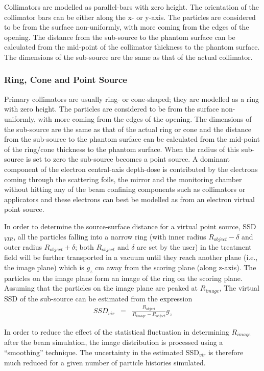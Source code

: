 \documentclass[12pt,twoside]{article}
\begin{document}
Collimators are modelled as parallel-bars with zero height. The orientation of the collimator bars can be either along the x- or y-axis. The particles are considered to be from the surface non-uniformly, with more coming from the edges of the opening. The distance from the sub-source to the phantom surface can be calculated from the mid-point of the collimator thickness to the phantom surface. The dimensions of the sub-source are the same as that of the actual collimator.

\subsubsection{Ring, Cone and Point Source}

Primary collimators are usually ring- or cone-shaped; they are modelled as a ring with zero height. The particles are considered to be from the surface non-uniformly, with more coming from the edges of the opening. The dimensions of the sub-source are the same as that of the actual ring or cone and the distance from the sub-source to the phantom surface can be calculated from the mid-point of the ring/cone thickness to the phantom surface. When the radius of this sub-source is set to zero the sub-source becomes a point source. A dominant component of the electron central-axis depth-dose is contributed by the electrons coming through the scattering foils, the mirror and the monitoring chamber without hitting any of the beam confining components such as collimators or applicators and these electrons can best be modelled as from an electron virtual point source.


In order to determine the source-surface distance
for a virtual point source, SSD$_{VIR}$,  all the particles falling into a
narrow ring (with inner radius $R_{object} - \delta$ and outer radius
$R_{object} + \delta$; both  $R_{object}$ and $\delta$ are set by the
user) in the treatment field will be further transported in a vacuum until
they reach another plane (i.e., the image plane) which is $g_z$ cm away
from the scoring plane (along z-axis). The particles on the image plane
form an image of the ring on the scoring plane. Assuming that the
particles on the image plane are peaked at $R_{image}$,  The virtual SSD
of the sub-source can be estimated from the expression
\begin{eqnarray} SSD_{vir} & =&  \frac{ R_{object}}{R_{image} -
 R_{object}} g_z
\end{eqnarray}

In order to reduce the effect of the statistical fluctuation in
determining $R_{image}$ after the beam simulation, the image distribution
is processed using a ``smoothing'' technique. The uncertainty in the
estimated SSD$_{vir}$ is therefore much reduced for a given number of
particle histories simulated.
\end{document}
